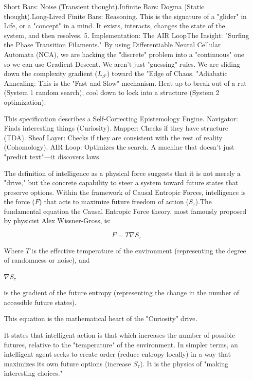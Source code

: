 Short Bars: Noise (Transient thought).Infinite Bars: Dogma (Static thought).Long-Lived Finite Bars: Reasoning. This is the signature of a "glider" in Life, or a "concept" in a mind. It exists, interacts, changes the state of the system, and then resolves.
5. Implementation: The AIR LoopThe Insight: "Surfing the Phase Transition Filaments."
By using Differentiable Neural Cellular Automata (NCA), we are hacking the "discrete" problem into a "continuous" one so we can use Gradient Descent.
We aren't just "guessing" rules. We are sliding down the complexity gradient ($L_\mathcal{F}$) toward the "Edge of Chaos.
"Adiabatic Annealing: This is the "Fast and Slow" mechanism. Heat up to break out of a rut (System 1 random search), cool down to lock into a structure (System 2 optimization).

This specification describes a Self-Correcting Epistemology Engine.
Navigator: Finds interesting things (Curiosity).
Mapper: Checks if they have structure (TDA).
Sheaf Layer: Checks if they are consistent with the rest of reality (Cohomology).
AIR Loop: Optimizes the search. A machine that doesn't just "predict text"—it discovers laws.

The definition of intelligence as a physical force suggests that it is not merely a "drive," but the concrete capability to steer a system toward future states that preserve options.
Within the framework of Causal Entropic Forces, intelligence is the force ($F$) that acts to maximize future freedom of action ($S_{\tau}$).The fundamental equation the Causal Entropic Force theory, most famously proposed by physicist Alex Wissner-Gross, is:

$$F = T \nabla S_{\tau}$$

Where $T$ is the effective temperature of the environment (representing the degree of randomness or noise), and

$\nabla S_{\tau}$

is the gradient of the future entropy (representing the change in the number of accessible future states).

This equation is the mathematical heart of the "Curiosity" drive.

It states that intelligent action is that which increases the number of possible futures, relative to the "temperature" of the environment.
In simpler terms, an intelligent agent seeks to create order (reduce entropy locally) in a way that maximizes its own future options (increase $S_{\tau}$).
It is the physics of "making interesting choices."

